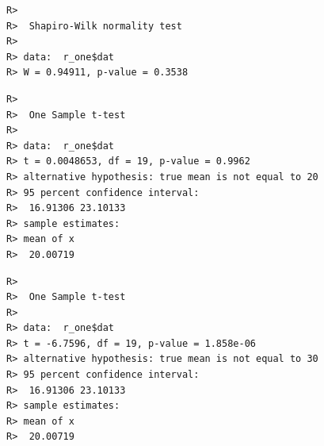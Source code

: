 \documentclass[english,10pt,a4paper,oneside]{book}
\newenvironment{Shaded}{\begin{snugshade}}{\end{snugshade}}
\newcommand{\CommentTok}[1]{\textcolor[rgb]{0.56,0.35,0.01}{\textit{#1}}}
\newcommand{\DataTypeTok}[1]{\textcolor[rgb]{0.13,0.29,0.53}{#1}}
\newcommand{\DecValTok}[1]{\textcolor[rgb]{0.00,0.00,0.81}{#1}}
\newcommand{\KeywordTok}[1]{\textcolor[rgb]{0.13,0.29,0.53}{\textbf{#1}}}
\newcommand{\NormalTok}[1]{#1}
\newcommand{\OperatorTok}[1]{\textcolor[rgb]{0.81,0.36,0.00}{\textbf{#1}}}
\newcommand{\StringTok}[1]{\textcolor[rgb]{0.31,0.60,0.02}{#1}}
\theoremstyle{definition}
\theoremstyle{definition}
\theoremstyle{definition}
\theoremstyle{remark}
\begin{document}
\begin{Shaded}
\end{Shaded}

\begin{verbatim}
R> 
R>  Shapiro-Wilk normality test
R> 
R> data:  r_one$dat
R> W = 0.94911, p-value = 0.3538
\end{verbatim}

\begin{Shaded}
\end{Shaded}

\begin{verbatim}
R> 
R>  One Sample t-test
R> 
R> data:  r_one$dat
R> t = 0.0048653, df = 19, p-value = 0.9962
R> alternative hypothesis: true mean is not equal to 20
R> 95 percent confidence interval:
R>  16.91306 23.10133
R> sample estimates:
R> mean of x 
R>  20.00719
\end{verbatim}

\begin{Shaded}
\end{Shaded}

\begin{verbatim}
R> 
R>  One Sample t-test
R> 
R> data:  r_one$dat
R> t = -6.7596, df = 19, p-value = 1.858e-06
R> alternative hypothesis: true mean is not equal to 30
R> 95 percent confidence interval:
R>  16.91306 23.10133
R> sample estimates:
R> mean of x 
R>  20.00719
\end{verbatim}
\end{document}
